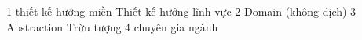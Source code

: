 

1 thiết kế hướng miền
Thiết kế hướng lĩnh vực
2 Domain (không dịch)
3 Abstraction Trừu tượng
4 chuyên gia ngành